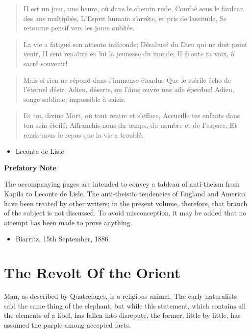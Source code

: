 \documentclass[]{book}
\providecommand{\tightlist}{%
  \setlength{\itemsep}{0pt}\setlength{\parskip}{0pt}}
\begin{document}
\begin{quote}
II est un jour, une heure, où dans le chemin rude, Courbé sous le
fardeau des ans multipliés, L'Esprit humain s'arrête, et pris de
lassitude, Se retourne pensif vers les jours oubliés.
\end{quote}

\begin{quote}
La vie a fatigué son attente inféconde; Désabusé du Dieu qui ne doit
point venir, II sent renaître en lui la jeunesse du monde; II écoute ta
voix, ô sacré souvenir!
\end{quote}

\begin{quote}
Mais si rien ne répond dans l'immense étendue Que le stérile écho de
l'éternel désir, Adieu, déserts, ou l'âme ouvre une aile éperdue! Adieu,
songe sublime, impossible à saisir.
\end{quote}

\begin{quote}
Et toi, divine Mort, où tout rentre et s'efface, Accueille tes enfants
dans ton sein étoilé; Affranchis-nous du temps, du nombre et de
I'espace, Et rends-nous le repos que la vie a troublé.
\end{quote}

\begin{itemize}
\tightlist
\item
  Leconte de Lisle
\end{itemize}

\textbf{Prefatory Note}

The accompanying pages are intended to convey a tableau of anti-theism
from Kapila to Leconte de Lisle. The anti-theistic tendencies of England
and America have been treated by other writers; in the present volume,
therefore, that branch of the subject is not discussed. To avoid
misconception, it may be added that no attempt has been made to prove
anything.

\begin{itemize}
\tightlist
\item
  Biarritz, 15th September, 1886.
\end{itemize}

\chapter{The Revolt Of the Orient}\label{the-revolt-of-the-orient}

Man, as described by Quatrefages, is a religious animal. The early
naturalists said the same thing of the elephant; but while this
statement, which contains all the elements of a libel, has fallen into
disrepute, the former, little by little, has assumed the purple among
accepted facts.
\end{document}
